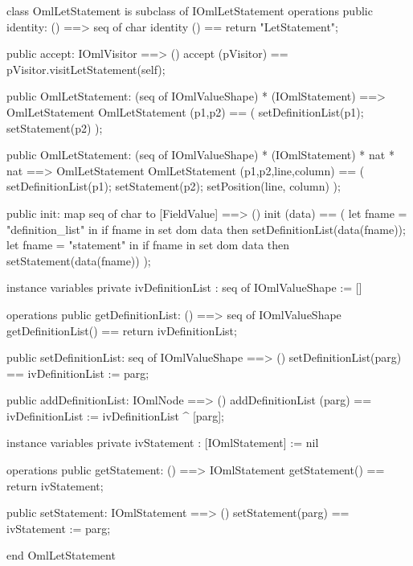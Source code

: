 \begin{vdm_al}
class OmlLetStatement is subclass of IOmlLetStatement
operations
  public identity: () ==> seq of char
  identity () == return "LetStatement";

  public accept: IOmlVisitor ==> ()
  accept (pVisitor) == pVisitor.visitLetStatement(self);

  public OmlLetStatement:
    (seq of IOmlValueShape) *
    (IOmlStatement) ==> OmlLetStatement
  OmlLetStatement (p1,p2) == 
    ( setDefinitionList(p1);
      setStatement(p2) );

  public OmlLetStatement:
    (seq of IOmlValueShape) *
    (IOmlStatement) *
    nat *
    nat ==> OmlLetStatement
  OmlLetStatement (p1,p2,line,column) == 
    ( setDefinitionList(p1);
      setStatement(p2);
      setPosition(line, column) );

  public init: map seq of char to [FieldValue] ==> ()
  init (data) ==
    ( let fname = "definition_list" in
        if fname in set dom data
        then setDefinitionList(data(fname));
      let fname = "statement" in
        if fname in set dom data
        then setStatement(data(fname)) );

instance variables
  private ivDefinitionList : seq of IOmlValueShape := []

operations
  public getDefinitionList: () ==> seq of IOmlValueShape
  getDefinitionList() == return ivDefinitionList;

  public setDefinitionList: seq of IOmlValueShape ==> ()
  setDefinitionList(parg) == ivDefinitionList := parg;

  public addDefinitionList: IOmlNode ==> ()
  addDefinitionList (parg) == ivDefinitionList := ivDefinitionList ^ [parg];

instance variables
  private ivStatement : [IOmlStatement] := nil

operations
  public getStatement: () ==> IOmlStatement
  getStatement() == return ivStatement;

  public setStatement: IOmlStatement ==> ()
  setStatement(parg) == ivStatement := parg;

end OmlLetStatement
\end{vdm_al}

